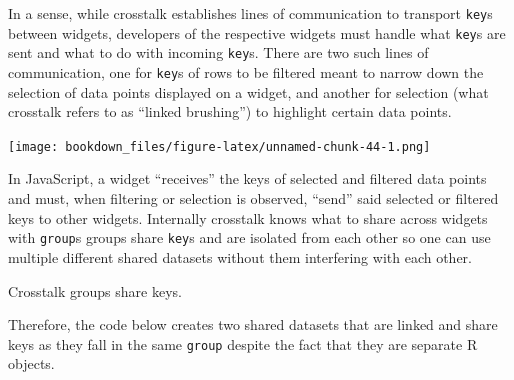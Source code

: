 \documentclass[
]{krantz}
\makeatletter
\newenvironment{Shaded}{\begin{snugshade}}{\end{snugshade}}
\newcommand{\CommentTok}[1]{\textcolor[rgb]{0.37,0.37,0.37}{\textit{#1}}}
\newcommand{\DataTypeTok}[1]{\textcolor[rgb]{0.27,0.27,0.27}{#1}}
\newcommand{\DecValTok}[1]{\textcolor[rgb]{0.06,0.06,0.06}{#1}}
\newcommand{\KeywordTok}[1]{\textcolor[rgb]{0.27,0.27,0.27}{\textbf{#1}}}
\newcommand{\NormalTok}[1]{#1}
\newcommand{\OperatorTok}[1]{\textcolor[rgb]{0.43,0.43,0.43}{\textbf{#1}}}
\newcommand{\StringTok}[1]{\textcolor[rgb]{0.5,0.5,0.5}{#1}}
\newenvironment{kframe}{%
\medskip{}
\setlength{\fboxsep}{.8em}
 \def\at@end@of@kframe{}%
 \ifinner\ifhmode%
  \def\at@end@of@kframe{\end{minipage}}%
  \begin{minipage}{\columnwidth}%
 \fi\fi%
 \def\FrameCommand##1{\hskip\@totalleftmargin \hskip-\fboxsep
 \colorbox{shadecolor}{##1}\hskip-\fboxsep
     \hskip-\linewidth \hskip-\@totalleftmargin \hskip\columnwidth}%
 \MakeFramed {\advance\hsize-\width
   \@totalleftmargin\z@ \linewidth\hsize
   \@setminipage}}%
 {\par\unskip\endMakeFramed%
 \at@end@of@kframe}
\renewenvironment{Shaded}{\begin{kframe}}{\end{kframe}}
\newenvironment{rmdblock}[1]
  {
  \begin{itemize}
  \renewcommand{\labelitemi}{
    \raisebox{-.7\height}[0pt][0pt]{
      {\setkeys{Gin}{width=3em,keepaspectratio}\texttt{[image: images/\#1]}}
    }
  }
  \setlength{\fboxsep}{1em}
  \begin{kframe}
  \item
  }
  {
  \end{kframe}
  \end{itemize}
  }
\newenvironment{rmdnote}
  {\begin{rmdblock}{note}}
  {\end{rmdblock}}
\makeatother
\begin{document}
\begin{Shaded}
\end{Shaded}

In a sense, while crosstalk establishes lines of communication to transport \texttt{key}s between widgets, developers of the respective widgets must handle what \texttt{key}s are sent and what to do with incoming \texttt{key}s. There are two such lines of communication, one for \texttt{key}s of rows to be filtered meant to narrow down the selection of data points displayed on a widget, and another for selection (what crosstalk refers to as ``linked brushing'') to highlight certain data points.

\texttt{[image: bookdown\_files/figure-latex/unnamed-chunk-44-1.png]}

In JavaScript, a widget ``receives'' the keys of selected and filtered data points and must, when filtering or selection is observed, ``send'' said selected or filtered keys to other widgets. Internally crosstalk knows what to share across widgets with \texttt{group}s groups share \texttt{key}s and are isolated from each other so one can use multiple different shared datasets without them interfering with each other.

\begin{rmdnote}
Crosstalk groups share keys.
\end{rmdnote}

Therefore, the code below creates two shared datasets that are linked and share keys as they fall in the same \texttt{group} despite the fact that they are separate R objects.

\begin{Shaded}
\end{Shaded}
\end{document}
